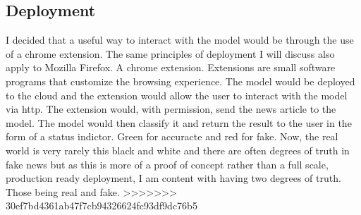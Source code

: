 \subsection{Deployment}
I decided that a useful way to interact with the model would be through the use of a chrome extension. The same principles of deployment I will discuss also apply to Mozilla Firefox. A chrome extension. Extensions are small software programs that customize the browsing experience. The model would be deployed to the cloud and the extension would allow the user to interact with the model via http. The extension would, with permission, send the news article to the model. The model would then classify it and return the result to the user in the form of a status indictor. Green for accuracte and red for fake. Now, the real world is very rarely this black and white and there are often degrees of truth in fake news but as this is more of a proof of concept rather than a full scale, production ready deployment, I am content with having two degrees of truth. Those being real and fake. 
>>>>>>> 30ef7bd4361ab47f7cb94326624fc93df9dc76b5
